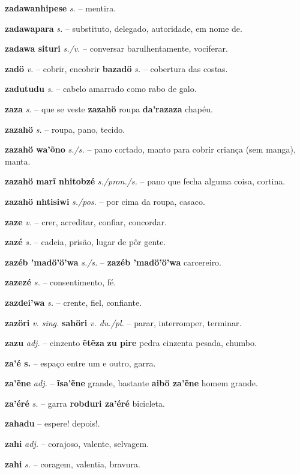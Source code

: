 \textbf{zadawanhipese} \textit{s.} -- mentira.

\textbf{zadawapara} \textit{s.} -- substituto, delegado, autoridade, em nome de.

\textbf{zadawa situri} \textit{s./v.} -- conversar barulhentamente, vociferar.

\textbf{zadö} \textit{v.} -- cobrir, encobrir  \textbf{bazadö} \textit{s.} -- cobertura das costas.

\textbf{zadutudu} \textit{s.} -- cabelo amarrado como rabo de galo.

\textbf{zaza} \textit{s.} -- que se veste  \textbf{zazahö} roupa  \textbf{da'razaza} chapéu.

\textbf{zazahö} \textit{s.} -- roupa, pano, tecido.

\textbf{zazahö wa'õno} \textit{s./s.} -- pano cortado, manto para cobrir criança (sem manga), manta.

\textbf{zazahö marĩ nhitobzé} \textit{s./pron./s.} -- pano que fecha alguma coisa, cortina.

\textbf{zazahö nhtisiwi} \textit{s./pos.} -- por cima da roupa, casaco.

\textbf{zaze} \textit{v.} -- crer, acreditar, confiar, concordar.

\textbf{zazé} \textit{s.} -- cadeia, prisão, lugar de pôr gente.

\textbf{zazéb 'madö'ö'wa} \textit{s./s.} -- \textbf{zazéb 'madö'ö'wa} carcereiro.

\textbf{zazezé} \textit{s.} -- consentimento, fé.

\textbf{zazdei'wa} \textit{s.} -- crente, fiel, confiante.

\textbf{zazöri} \textit{v. sing.} \textbf{sahöri} \textit{v. du./pl.} -- parar, interromper, terminar.

\textbf{zazu} \textit{adj.} -- cinzento  \textbf{ẽtẽza} \textbf{zu pire} pedra cinzenta pesada, chumbo.

\textbf{za'é s.} -- espaço entre um e outro, garra.

\textbf{za'ẽne} \textit{adj.} -- \textbf{ĩsa'ẽne} grande, bastante  \textbf{aibö za'ẽne} homem grande.

\textbf{za'éré} \textit{s.} -- garra  \textbf{robduri za'éré} bicicleta.

\textbf{zahadu} -- espere! depois!.

\textbf{zahi} \textit{adj.} -- corajoso, valente, selvagem.

\textbf{zahi} \textit{s.} -- coragem, valentia, bravura.

